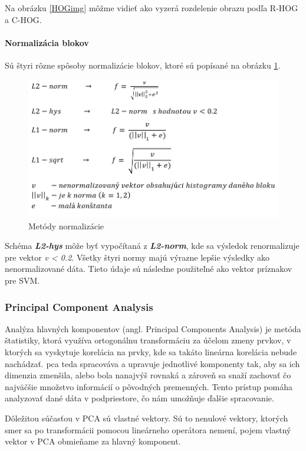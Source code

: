 Na obrázku \ref{HOGimg} môžme vidieť ako vyzerá rozdelenie obrazu podľa R-HOG a C-HOG.

\paragraph{Normalizácia blokov}
Sú štyri rôzne spôsoby normalizácie blokov, ktoré sú popísané na obrázku \ref{HOGnorm}.

\begin{figure}[H]
  \centering
  \includegraphics[width=14cm]{img/HOGnorm.png}
  \caption{Metódy normalizácie}
  \label{HOGnorm}
\end{figure}

Schéma \textbf{\textit{L2-hys}} môže byť vypočítaná z \textbf{\textit{L2-norm}}, kde sa výsledok renormalizuje pre vektor \textit{v < 0.2}. Všetky štyri normy majú výrazne lepšie výsledky ako nenormalizované dáta. Tieto údaje sú následne použiteľné ako vektor príznakov pre SVM. \cite{c11}


\subsubsection{Principal Component Analysis} \label{PCAlabel}
Analýza hlavných komponentov (angl. Principal Components Analysis) je metóda štatistiky, ktorá využíva ortogonálnu transformáciu za účelom zmeny prvkov, v ktorých sa vyskytuje korelácia na prvky, kde  sa takáto lineárna korelácia nebude nachádzať. \acrshort{pca} teda spracováva a upravuje jednotlivé komponenty tak, aby sa ich dimenzia zmenšila, alebo bola nanajvýš rovnaká a zároveň sa snaží zachovať čo najväčšie množstvo informácií o pôvodných premenných. Tento prístup pomáha analyzovať dané dáta v podpriestore, čo nám umožňuje ďalšie spracovanie.

Dôležitou súčasťou v PCA sú vlastné vektory. Sú to nenulové vektory, ktorých smer sa po transformácii pomocou lineárneho operátora nemení, pojem vlastný vektor v PCA obmieňame za hlavný komponent. 

